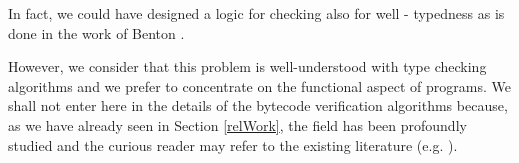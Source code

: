 \begin{description}
	In fact, we could have  designed a logic for checking also for well - typedness as 
	is done in the work of Benton \cite{B04tlsj}.

	However, we consider that this problem is well-understood
	with type checking algorithms and we prefer to concentrate on the functional aspect of programs. 
	We shall not enter  here in the details of the bytecode verification algorithms
	because, as we have already seen in Section \ref{relWork}, the field has been profoundly studied
	and the curious reader may refer to the existing literature (e.g. \cite{Ljbc}). 
	
 
	
	
\end{description}







